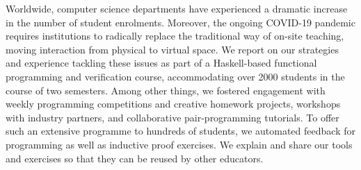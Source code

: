 Worldwide, computer science departments have experienced a dramatic increase in the number of student enrolments.
Moreover, the ongoing COVID-19 pandemic requires institutions to radically replace the traditional way of on-site teaching,
moving interaction from physical to virtual space.
We report on our strategies and experience tackling these issues
as part of a Haskell-based functional programming and verification course,
accommodating over 2000 students in the course of two semesters.
Among other things,
we fostered engagement with weekly programming competitions
and creative homework projects,
workshops with industry partners,
and collaborative pair-programming tutorials.
To offer such an extensive programme to hundreds of students,
we automated feedback for programming as well as
inductive proof exercises.
We explain and share our tools and exercises so that they can be reused by other educators.

